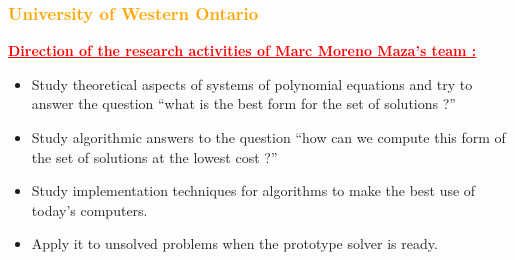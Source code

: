 \begin{frame}[fragile]
\frametitle{\textbf{\textcolor{orange}{University of Western Ontario}}}

\begin{center}
\end{center}

\begin{block}{}
\textcolor{red}{\underline{\textbf{Direction of the research activities of Marc Moreno Maza's team :}}}

\begin{itemize}
\item Study theoretical aspects of systems of polynomial equations and try to answer the question ``what is the best form for the set of solutions ?''
\item Study algorithmic answers to the question ``how can we compute this form of the set of solutions at the lowest cost ?''
\item Study implementation techniques for algorithms to make the best use of today's computers.
\item Apply it to unsolved problems when the prototype solver is ready.
\end{itemize}
\end{block}

\end{frame}

